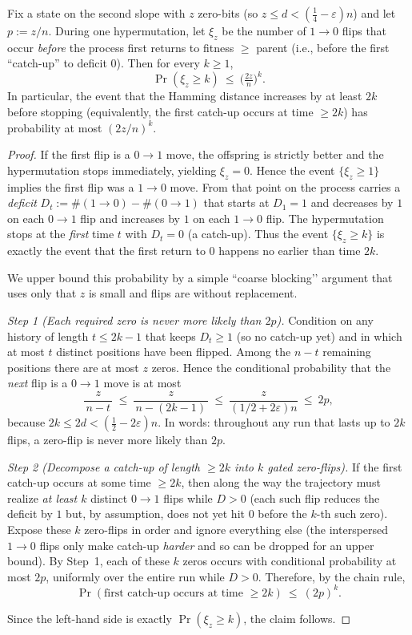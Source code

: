 \documentclass[lettersize,journal]{IEEEtran}
\begin{document}
\begin{lemma}\label{lem:xi-tail}
	Fix a state on the second slope with $z$ zero-bits (so $z\le d<(\tfrac14-\varepsilon)n$) and let $p:=z/n$.
	During one hypermutation, let $\xi_z$ be the number of $1\!\to 0$ flips that occur \emph{before} the process first returns to fitness $\ge$ parent (i.e., before the first ``catch-up'' to deficit $0$). Then for every $k\ge 1$,
	\[
	\Pr(\xi_z\ge k)\ \le\ \Big(\tfrac{2z}{n}\Big)^k.
	\]
	In particular, the event that the Hamming distance increases by at least $2k$ before stopping (equivalently, the first catch-up occurs at time $\ge 2k$) has probability at most $(2z/n)^k$.
\end{lemma}

\begin{proof}
	If the first flip is a $0\!\to 1$ move, the offspring is strictly better and the hypermutation stops immediately, yielding $\xi_z=0$. Hence the event $\{\xi_z\ge 1\}$ implies the first flip was a $1\!\to 0$ move. From that point on the process carries a \emph{deficit} $D_t:=\#(1\!\to 0)-\#(0\!\to 1)$ that starts at $D_1=1$ and decreases by $1$ on each $0\!\to 1$ flip and increases by $1$ on each $1\!\to 0$ flip. The hypermutation stops at the \emph{first} time $t$ with $D_t=0$ (a catch-up). Thus the event $\{\xi_z\ge k\}$ is exactly the event that the first return to $0$ happens no earlier than time $2k$.
	
	We upper bound this probability by a simple ``coarse blocking’’ argument that uses only that $z$ is small and flips are without replacement.
	
	\smallskip
	\emph{Step 1 (Each required zero is never more likely than $2p$).}
	Condition on any history of length $t\le 2k-1$ that keeps $D_t\ge 1$ (so no catch-up yet) and in which at most $t$ distinct positions have been flipped. Among the $n-t$ remaining positions there are at most $z$ zeros. Hence the conditional probability that the \emph{next} flip is a $0\!\to 1$ move is at most
	\[
	\frac{z}{\,n-t\,}\ \le\ \frac{z}{\,n-(2k-1)\,}\ \le\ \frac{z}{(1/2+2\varepsilon)n}\ \le\ 2p,
	\]
	because $2k\le 2d<(\tfrac12-2\varepsilon)n$. In words: throughout any run that lasts up to $2k$ flips, a zero-flip is never more likely than $2p$.
	
	\smallskip
	\emph{Step 2 (Decompose a catch-up of length $\ge 2k$ into $k$ gated zero-flips).}
	If the first catch-up occurs at some time $\ge 2k$, then along the way the trajectory must realize \emph{at least $k$} distinct $0\!\to 1$ flips while $D>0$ (each such flip reduces the deficit by $1$ but, by assumption, does not yet hit $0$ before the $k$-th such zero). Expose these $k$ zero-flips in order and ignore everything else (the interspersed $1\!\to 0$ flips only make catch-up \emph{harder} and so can be dropped for an upper bound). By Step~1, each of these $k$ zeros occurs with conditional probability at most $2p$, uniformly over the entire run while $D>0$. Therefore, by the chain rule,
	\[
	\Pr(\text{first catch-up occurs at time }\ge 2k)\ \le\ (2p)^k.
	\]
	
		
	Since the left-hand side is exactly $\Pr(\xi_z\ge k)$, the claim follows.
\end{proof}
\end{document}
